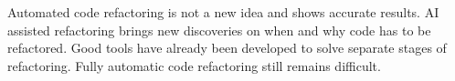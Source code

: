 Automated code refactoring is not a new idea and shows accurate results. AI assisted refactoring brings new discoveries on when and why code has to be refactored.
Good tools have already been developed to solve separate stages of refactoring. Fully automatic code refactoring still remains difficult.